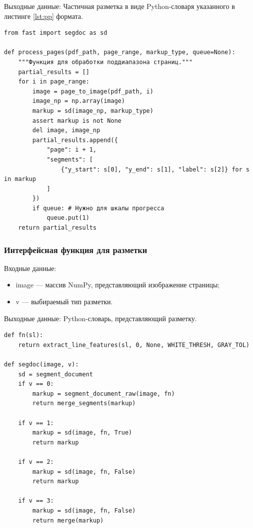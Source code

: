 Выходные данные: Частичная разметка в виде Python-словаря указанного в листинге \ref{lst:pp} формата.

\begin{lstlisting}[caption={Функция обработки страниц}, label={lst:pp}]
from fast import segdoc as sd

def process_pages(pdf_path, page_range, markup_type, queue=None):
    """Функция для обработки поддиапазона страниц."""
    partial_results = []
    for i in page_range:
        image = page_to_image(pdf_path, i)
        image_np = np.array(image)
        markup = sd(image_np, markup_type)
        assert markup is not None
        del image, image_np
        partial_results.append({
            "page": i + 1,
            "segments": [
                {"y_start": s[0], "y_end": s[1], "label": s[2]} for s in markup
            ]
        })
        if queue: # Нужно для шкалы прогресса
            queue.put(1)
    return partial_results
\end{lstlisting}

\subsubsection{Интерфейсная функция для разметки}
Входные данные:
\begin{itemize}
    \item image --- массив NumPy, представляющий изображение страницы;
    \item v --- выбираемый тип разметки.
\end{itemize}

Выходные данные: Python-словарь, представляющий разметку.

\begin{lstlisting}[caption={Интерфейсная функция для разметки}, label={}]
def fn(sl):
    return extract_line_features(sl, 0, None, WHITE_THRESH, GRAY_TOL)

def segdoc(image, v):
    sd = segment_document
    if v == 0:
        markup = segment_document_raw(image, fn)
        return merge_segments(markup)

    if v == 1:
        markup = sd(image, fn, True)
        return markup

    if v == 2:
        markup = sd(image, fn, False)
        return markup

    if v == 3:
        markup = sd(image, fn, False)
        return merge(markup)
\end{lstlisting}

